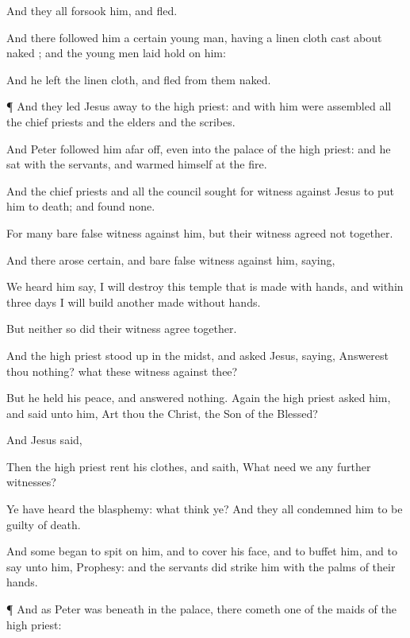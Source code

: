 {And
they
all
forsook
him, and
fled.

And there
followed
him a
certain young
man,
having a linen
cloth
cast
about
{}
naked
{};
and the young
men laid
hold on
him:

And he
left the linen
cloth, and
fled
from
them
naked.


\par }{\PP {}¶
And they
led
Jesus
away
to the high
priest:
and with
him were
assembled
all the chief
priests
and the
elders
and the
scribes.

And
Peter
followed
him afar
off,
even
into the
palace of the high
priest:
and he
sat
with the
servants,
and warmed
himself
at the
fire.

And the chief
priests
and
all the
council sought
for
witness
against
Jesus to
put
him
to
death;
and
found
none.

For
many bare false
witness
against
him,
but their
witness
agreed
not
together.

And there
arose
certain, and bare false
witness
against
him,
saying,

We
heard
him
say,
I will
destroy
this
temple
that is made with
hands,
and
within
three
days I will
build
another made without
hands.

But
neither
so
did
their
witness
agree
together.

And the high
priest stood
up
in the
midst, and
asked
Jesus,
saying, Answerest
thou
nothing?
what
{}
these witness
against
thee?

But he held his
peace,
and
answered
nothing.
Again the high
priest
asked
him,
and
said unto
him,
Art
thou the
Christ, the
Son of the
Blessed?

And
Jesus
said,
{}

Then the high
priest
rent
his
clothes, and
saith,
What
need we
any
further
witnesses?

Ye have
heard the
blasphemy:
what
think
ye?
And
they
all
condemned
him to
be guilty
of
death.

And
some
began to
spit on
him,
and to
cover
his
face,
and to
buffet
him,
and to
say unto
him,
Prophesy:
and the
servants did
strike
him with the palms of their
hands.


\par }{\PP {}¶
And as
Peter
was
beneath
in the
palace, there
cometh
one of the
maids of the high
priest:

}
